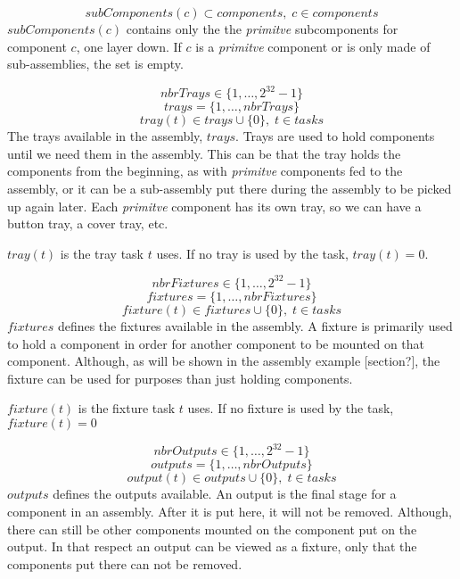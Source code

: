 \documentclass[10pt,a4paper]{report}
\begin{document}
\begin{equation}\label{eq:55}
subComponents(c) \subset components, \; c \in components\end{equation}
$subComponents(c)$ contains only the the \emph{primitve} subcomponents for component $c$, one layer down. If $c$ is a \emph{primitve} component or is only made of sub-assemblies, the set is empty.

\begin{equation}\label{eq:4}
nbrTrays \in \{1 , \ldots , 2^{32}-1\}
\end{equation}
\begin{equation}\label{eq:14}
trays = \{1 , \ldots , nbrTrays\}
\end{equation}
\begin{equation}\label{eq:22}
tray(t) \in trays \cup \{0\}, \; t \in tasks
\end{equation}
The trays available in the assembly, $trays$. Trays are used to hold components until we need them in the assembly. This can be that the tray holds the components from the beginning, as with \emph{primitve} components fed to the assembly, or it can be a sub-assembly put there during the assembly to be picked up again later. Each \emph{primitve} component has its own tray, so we can have a button tray, a cover tray, etc.

$tray(t)$ is the tray task $t$ uses. If no tray is used by the task, $tray(t) = 0$.


\begin{equation}\label{eq:5}
nbrFixtures \in \{1 , \ldots , 2^{32}-1\}
\end{equation}
\begin{equation}\label{eq:15}
fixtures = \{1 , \ldots , nbrFixtures\}
\end{equation}
\begin{equation}\label{eq:24}
fixture(t) \in fixtures \cup \{0\}, \; t \in tasks
\end{equation}
$fixtures$ defines the fixtures available in the assembly. A fixture is primarily used to hold a component in order for another component to be mounted on that component. Although, as will be shown in the assembly example [section?], the fixture can be used for purposes than just holding components.

$fixture(t)$ is the fixture task $t$ uses. If no fixture is used by the task, $fixture(t) = 0$

\begin{equation}\label{eq:7}
nbrOutputs \in \{1 , \ldots , 2^{32}-1\}
\end{equation}
\begin{equation}\label{eq:16}
outputs = \{1 , \ldots , nbrOutputs\}
\end{equation}
\begin{equation}\label{eq:23}
output(t) \in outputs \cup \{0\}, \; t \in tasks
\end{equation}
$outputs$ defines the outputs available. An output is the final stage for a component in an assembly. After it is put here, it will not be removed. Although, there can still be other components mounted on the component put on the output. In that respect an output can be viewed as a fixture, only that the components put there can not be removed.
\end{document}
